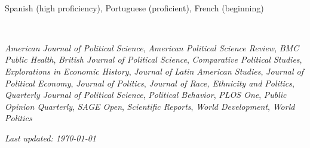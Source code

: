 \documentclass[11pt]{article}
\begin{document}
\vspace{.3in}
\begin{minipage}[t]{.22\textwidth}
	\hspace*{.15in}  \\
\end{minipage}
\begin{minipage}[t]{.78\textwidth}
	Spanish (high proficiency), Portuguese (proficient), French (beginning)  \\
\end{minipage}

\vspace{.3in}
\begin{minipage}[t]{.22\textwidth}
	\flushright
	 \hspace*{.2in} \\
\end{minipage}
\begin{minipage}[t]{.78\textwidth}
	\emph{American Journal of Political Science}, \emph{American Political Science Review}, \emph{BMC Public Health}, \emph{British Journal of Political Science}, \emph{Comparative Political Studies}, \emph{Explorations in Economic History}, \emph{Journal of Latin American Studies}, \emph{Journal of Political Economy}, \emph{Journal of Politics}, \emph{Journal of Race, Ethnicity and Politics}, \emph{Quarterly Journal of Political Science}, \emph{Political Behavior}, \emph{PLOS One}, \emph{Public Opinion Quarterly}, \emph{SAGE Open}, \emph{Scientific Reports}, \emph{World Development}, \emph{World Politics}
\end{minipage}


\vspace*{.9in}
\hfill \small \emph{Last updated: \today} \vspace*{-.1in}


\end{document}
